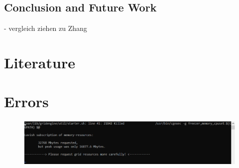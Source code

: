 \documentclass[12pt,letterpaper]{article}
\begin{document}
\subsection{Conclusion and Future Work}
- vergleich ziehen zu Zhang\\
\newpage
\thispagestyle{empty}
\section{Literature}
\label{Lit}

\renewcommand{\bibsection}{}



\newpage
\appendix
{}
\section{Errors}
\begin{figure}[ht]
	\centering
	\includegraphics[width=1.0\textwidth]{error.png}
	\caption{}
	\label{error}
\end{figure}

	
\end{document}
